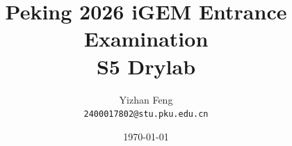 \title{\textbf{Peking 2026 iGEM Entrance Examination} \\[0.5em]
    \Large S5 Drylab}
\author{Yizhan Feng \\ 
    \normalsize{\texttt{2400017802@stu.pku.edu.cn}}}
\date{\today}